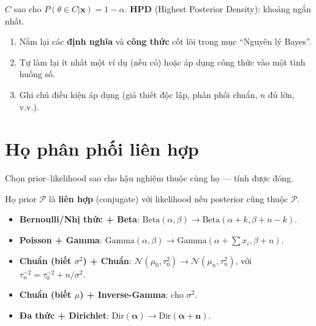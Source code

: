 \documentclass[12pt,a4paper]{article}
\begin{document}
\begin{dinhnghia}[title={Khoảng tin cậy Bayes (credible interval)}]
  $C$ sao cho $P(\theta \in C|\mathbf{x}) = 1 - \alpha$. \textbf{HPD} (Highest Posterior Density): khoảng ngắn nhất.
\end{dinhnghia}


\begin{tongket}[title={Tổng kết: Nguyên lý Bayes}]
\begin{enumerate}
  \item Nắm lại các \textbf{định nghĩa} và \textbf{công thức} cốt lõi trong mục ``Nguyên lý Bayes''.
  \item Tự làm lại ít nhất một ví dụ (nếu có) hoặc áp dụng công thức vào một tình huống số.
  \item Ghi chú điều kiện áp dụng (giả thiết độc lập, phân phối chuẩn, $n$ đủ lớn, v.v.).
\end{enumerate}
\end{tongket}

\section{Họ phân phối liên hợp}

\begin{dongco}[title={Động cơ --- Họ phân phối liên hợp}]
Chọn prior--likelihood sao cho hậu nghiệm thuộc cùng họ --- tính được đóng.
\end{dongco}

\begin{dinhnghia}
  Họ prior $\mathcal{P}$ là \textbf{liên hợp} (conjugate) với likelihood nếu posterior cũng thuộc $\mathcal{P}$.
\end{dinhnghia}

\begin{congthuc}[title={Các cặp liên hợp quan trọng}]
  \begin{itemize}
    \item \textbf{Bernoulli/Nhị thức + Beta}: $\text{Beta}(\alpha, \beta) \to \text{Beta}(\alpha + k, \beta + n - k)$.
    \item \textbf{Poisson + Gamma}: $\text{Gamma}(\alpha, \beta) \to \text{Gamma}(\alpha + \sum x_i, \beta + n)$.
    \item \textbf{Chuẩn (biết $\sigma^2$) + Chuẩn}: $\mathcal{N}(\mu_0, \tau_0^2) \to \mathcal{N}(\mu_n, \tau_n^2)$, với $\tau_n^{-2} = \tau_0^{-2} + n/\sigma^2$.
    \item \textbf{Chuẩn (biết $\mu$) + Inverse-Gamma}: cho $\sigma^2$.
    \item \textbf{Đa thức + Dirichlet}: $\text{Dir}(\boldsymbol{\alpha}) \to \text{Dir}(\boldsymbol{\alpha} + \mathbf{n})$.
  \end{itemize}
\end{congthuc}
\end{document}
